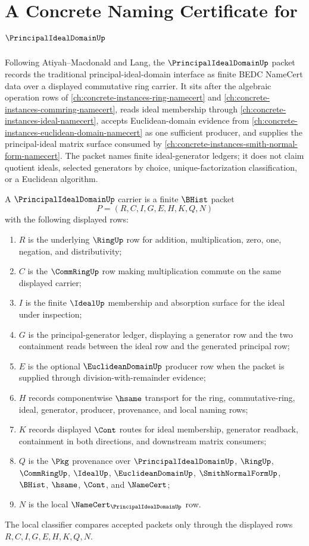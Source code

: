 \chapter{A Concrete Naming Certificate for $\PrincipalIdealDomainUp$}
\label{ch:concrete-instances-principal-ideal-domain-namecert}

Following Atiyah--Macdonald and Lang, the $\PrincipalIdealDomainUp$ packet records the traditional principal-ideal-domain interface as finite BEDC NameCert data over a displayed commutative ring carrier. It sits after the algebraic operation rows of \autoref{ch:concrete-instances-ring-namecert} and \autoref{ch:concrete-instances-commring-namecert}, reads ideal membership through \autoref{ch:concrete-instances-ideal-namecert}, accepts Euclidean-domain evidence from \autoref{ch:concrete-instances-euclidean-domain-namecert} as one sufficient producer, and supplies the principal-ideal matrix surface consumed by \autoref{ch:concrete-instances-smith-normal-form-namecert}. The packet names finite ideal-generator ledgers; it does not claim quotient ideals, selected generators by choice, unique-factorization classification, or a Euclidean algorithm.

\begin{definition}
\label{def:principal-ideal-domain-carrier}
A $\PrincipalIdealDomainUp$ carrier is a finite $\BHist$ packet
$$
P=(R,C,I,G,E,H,K,Q,N)
$$
with the following displayed rows:
\begin{enumerate}
\item $R$ is the underlying $\RingUp$ row for addition, multiplication, zero, one, negation, and distributivity;
\item $C$ is the $\CommRingUp$ row making multiplication commute on the same displayed carrier;
\item $I$ is the finite $\IdealUp$ membership and absorption surface for the ideal under inspection;
\item $G$ is the principal-generator ledger, displaying a generator row and the two containment reads between the ideal row and the generated principal row;
\item $E$ is the optional $\EuclideanDomainUp$ producer row when the packet is supplied through division-with-remainder evidence;
\item $H$ records componentwise $\hsame$ transport for the ring, commutative-ring, ideal, generator, producer, provenance, and local naming rows;
\item $K$ records displayed $\Cont$ routes for ideal membership, generator readback, containment in both directions, and downstream matrix consumers;
\item $Q$ is the $\Pkg$ provenance over $\PrincipalIdealDomainUp$, $\RingUp$, $\CommRingUp$, $\IdealUp$, $\EuclideanDomainUp$, $\SmithNormalFormUp$, $\BHist$, $\hsame$, $\Cont$, and $\NameCert$;
\item $N$ is the local $\NameCert_{\PrincipalIdealDomainUp}$ row.
\end{enumerate}
The local classifier compares accepted packets only through the displayed rows $R,C,I,G,E,H,K,Q,N$.
\end{definition}

